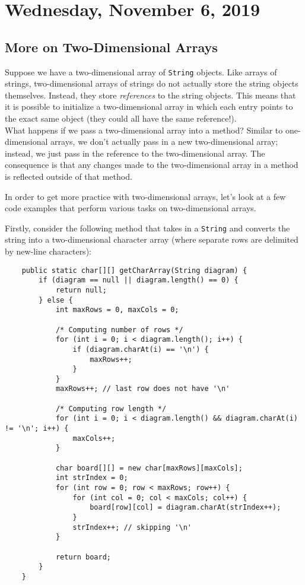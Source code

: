 \section{Wednesday, November 6, 2019}

\subsection{More on Two-Dimensional Arrays}

Suppose we have a two-dimensional array of \verb!String! objects. Like arrays of strings, two-dimensional arrays of strings do not actually store the string objects themselves. Instead, they store \textit{references} to the string objects. This means that it is possible to initialize a two-dimensional array in which each entry points to the exact same object (they could all have the same reference!). \\


What happens if we pass a two-dimensional array into a method? Similar to one-dimensional arrays, we don't actually pass in a new two-dimensional array; instead, we just pass in the reference to the two-dimensional array. The consequence is that any changes made to the two-dimensional array in a method is reflected outside of that method.


In order to get more practice with two-dimensional arrays, let's look at a few code examples that perform various tasks on two-dimensional arrays.

Firstly, consider the following method that takes in a \verb!String! and converts the string into a two-dimensional character array (where separate rows are delimited by new-line characters):

\begin{lstlisting}
	public static char[][] getCharArray(String diagram) {
		if (diagram == null || diagram.length() == 0) {
			return null;
		} else {
			int maxRows = 0, maxCols = 0;

			/* Computing number of rows */
			for (int i = 0; i < diagram.length(); i++) {
				if (diagram.charAt(i) == '\n') {
					maxRows++;
				}
			}
			maxRows++; // last row does not have '\n'

			/* Computing row length */
			for (int i = 0; i < diagram.length() && diagram.charAt(i) != '\n'; i++) {
				maxCols++;
			}

			char board[][] = new char[maxRows][maxCols];
			int strIndex = 0;
			for (int row = 0; row < maxRows; row++) {
				for (int col = 0; col < maxCols; col++) {
					board[row][col] = diagram.charAt(strIndex++);
				}
				strIndex++; // skipping '\n'
			}
			
			return board;
		}
	}
\end{lstlisting}

